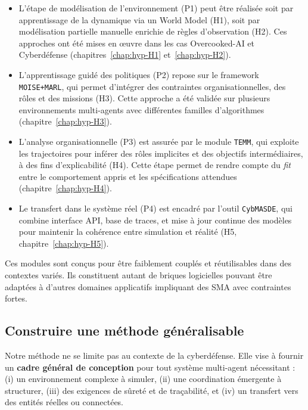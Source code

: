 \documentclass[ twoside,openright,titlepage,numbers=noenddot,headinclude,%
                footinclude=true,cleardoublepage=empty,abstractoff, %
                BCOR=5mm,paper=a4,fontsize=11pt,%
                french,american,%
                ]{scrreprt}
\begin{document}
\begin{itemize}
    \item L'étape de modélisation de l'environnement (P1) peut être réalisée soit par apprentissage de la dynamique via un World Model (H1), soit par modélisation partielle manuelle enrichie de règles d'observation (H2). Ces approches ont été mises en œuvre dans les cas Overcooked-AI et Cyberdéfense (chapitres~\ref{chap:hyp-H1} et~\ref{chap:hyp-H2}).

    \item L'apprentissage guidé des politiques (P2) repose sur le framework \texttt{MOISE+MARL}, qui permet d'intégrer des contraintes organisationnelles, des rôles et des missions (H3). Cette approche a été validée sur plusieurs environnements multi-agents avec différentes familles d'algorithmes (chapitre~\ref{chap:hyp-H3}).

    \item L'analyse organisationnelle (P3) est assurée par le module \texttt{TEMM}, qui exploite les trajectoires pour inférer des rôles implicites et des objectifs intermédiaires, à des fins d'explicabilité (H4). Cette étape permet de rendre compte du \textit{fit} entre le comportement appris et les spécifications attendues (chapitre~\ref{chap:hyp-H4}).

    \item Le transfert dans le système réel (P4) est encadré par l'outil \texttt{CybMASDE}, qui combine interface API, base de traces, et mise à jour continue des modèles pour maintenir la cohérence entre simulation et réalité (H5, chapitre~\ref{chap:hyp-H5}).
\end{itemize}

Ces modules sont conçus pour être faiblement couplés et réutilisables dans des contextes variés. Ils constituent autant de briques logicielles pouvant être adaptées à d'autres domaines applicatifs impliquant des SMA avec contraintes fortes.

\subsection{Construire une méthode généralisable}

Notre méthode ne se limite pas au contexte de la cyberdéfense. Elle vise à fournir un \textbf{cadre général de conception} pour tout système multi-agent nécessitant : (i) un environnement complexe à simuler, (ii) une coordination émergente à structurer, (iii) des exigences de sûreté et de traçabilité, et (iv) un transfert vers des entités réelles ou connectées.
\end{document}
